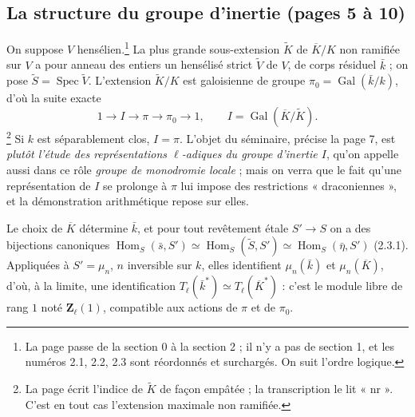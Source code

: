 \documentclass[11pt,a4paper]{article}
\begin{document}
\subsection*{La structure du groupe d'inertie (pages 5 à 10)}

On suppose $V$ hensélien.\footnote{La page passe de la section 0 à la section 2 ;
il n'y a pas de section 1, et les numéros 2.1, 2.2, 2.3 sont réordonnés et
surchargés. On suit l'ordre logique.} La plus grande sous-extension
$\widetilde K$ de $\overline K / K$ non ramifiée sur $V$ a pour anneau des
entiers un hensélisé strict $\widetilde V$ de $V$, de corps résiduel $\bar k$ ;
on pose $\widetilde S = \operatorname{Spec}\widetilde V$. L'extension
$\widetilde K/K$ est galoisienne de groupe $\pi_0 = \operatorname{Gal}(\bar k/k)$,
d'où la suite exacte
\[
  1 \to I \to \pi \to \pi_0 \to 1, \qquad I = \operatorname{Gal}(\overline K/\widetilde K).
\]
\footnote{La page écrit l'indice de $\widetilde K$ de façon empâtée ; la
transcription le lit « nr ». C'est en tout cas l'extension maximale non
ramifiée.} Si $k$ est séparablement clos, $I = \pi$. L'objet du séminaire,
précise la page 7, est \emph{plutôt l'étude des représentations $\ell$-adiques
du groupe d'inertie $I$}, qu'on appelle aussi dans ce rôle \emph{groupe de
monodromie locale} ; mais on verra que le fait qu'une représentation de $I$ se
prolonge à $\pi$ lui impose des restrictions « draconiennes », et la
démonstration arithmétique repose sur elles.

Le choix de $\overline K$ détermine $\bar k$, et pour tout revêtement étale
$S' \to S$ on a des bijections canoniques
$\operatorname{Hom}_S(\bar s, S') \simeq \operatorname{Hom}_S(\widetilde S, S')
\simeq \operatorname{Hom}_S(\bar\eta, S')$ (2.3.1). Appliquées à $S' = \mu_n$,
$n$ inversible sur $k$, elles identifient $\mu_n(\bar k)$ et
$\mu_n(\overline K)$, d'où, à la limite, une identification
$T_\ell(\bar k^*) \simeq T_\ell(\overline K^*)$ : c'est le module libre de rang
$1$ noté $\mathbf{Z}_\ell(1)$, compatible aux actions de $\pi$ et de $\pi_0$.
\end{document}
